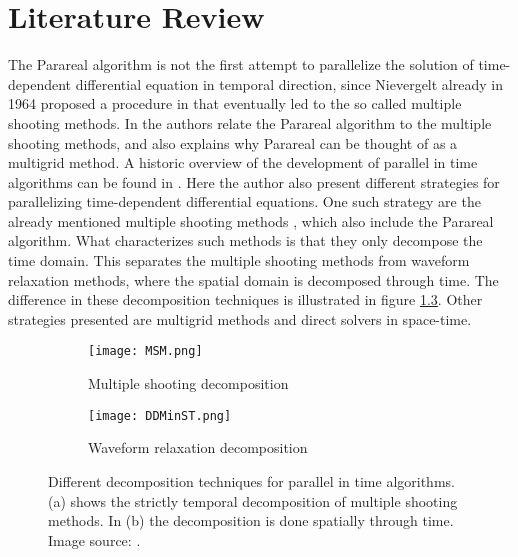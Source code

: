 \chapter{Literature Review} \label{lit_chap}
The Parareal algorithm is not the first attempt to parallelize the solution of time-dependent differential equation in temporal direction, since Nievergelt already in 1964 proposed a procedure in \cite{nievergelt1964parallel} that eventually led to the so called multiple shooting methods. In \cite{gander2007superlinear} the authors relate the Parareal algorithm to the multiple shooting methods, and also explains why Parareal can be thought of as a multigrid method. A historic overview of the development of parallel in time algorithms can be found in \cite{gander201550}. Here the author also present different strategies for parallelizing time-dependent differential equations. One such strategy are the already mentioned multiple shooting methods \cite{nievergelt1964parallel, bellen1989parallel}, which also include the Parareal algorithm. What characterizes such methods is that they only decompose the time domain. This separates the multiple shooting methods from waveform relaxation methods\cite{lelarasmee1982waveform,gander1996overlapping}, where the spatial domain is decomposed through time. The difference in these decomposition techniques is illustrated in figure \ref{fig:fig}. Other strategies presented are multigrid \cite{hackbusch1985parabolic,lubich1987multi,horton1995space} methods and direct solvers in space-time\cite{miranker1967parallel,maday2008parallelization,guttel2013parallel}.
\\
\begin{figure}[h]
\centering
\begin{subfigure}{.5\textwidth}
  \centering
  \texttt{[image: MSM.png]}
  \caption{Multiple shooting decomposition}
  \label{fig:sfig1}
\end{subfigure}%
\begin{subfigure}{.5\textwidth}
  \centering
  \texttt{[image: DDMinST.png]}
  \caption{Waveform relaxation decomposition}
  \label{fig:sfig2}
\end{subfigure}
\caption{Different decomposition techniques for parallel in time algorithms. (a) shows the strictly temporal decomposition of multiple shooting methods. In (b) the decomposition is done spatially through time. Image source: \cite{gander201550}.}
\label{fig:fig}
\end{figure}
\noindent
\\
